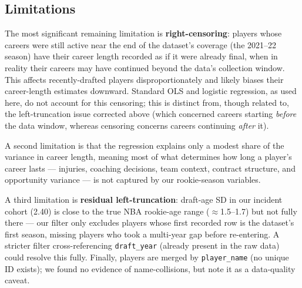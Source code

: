 \documentclass[10pt,twocolumn]{article}
\begin{document}
\subsection{Limitations}
\label{sec:limitations}
The most significant remaining limitation is \textbf{right-censoring}:
players whose careers were still active near the end of the dataset's
coverage (the 2021--22 season) have their career length recorded as if
it were already final, when in reality their careers may have
continued beyond the data's collection window. This affects
recently-drafted players disproportionately and likely biases their
career-length estimates downward. Standard OLS and logistic regression,
as used here, do not account for this censoring; this is distinct from,
though related to, the left-truncation issue corrected above (which
concerned careers starting \textit{before} the data window, whereas
censoring concerns careers continuing \textit{after} it).

A second limitation is that the regression explains only a modest
share of the variance in career length, meaning most of what
determines how long a player's career lasts --- injuries, coaching
decisions, team context, contract structure, and opportunity variance
--- is not captured by our rookie-season variables.

A third limitation is \textbf{residual left-truncation}: draft-age SD
in our incident cohort (2.40) is close to the true NBA rookie-age
range ($\approx$1.5--1.7) but not fully there --- our filter only
excludes players whose first recorded row is the dataset's first
season, missing players who took a multi-year gap before re-entering.
A stricter filter cross-referencing \texttt{draft\_year} (already
present in the raw data) could resolve this fully. Finally, players
are merged by \texttt{player\_name} (no unique ID exists); we found no
evidence of name-collisions, but note it as a data-quality caveat.
\end{document}
